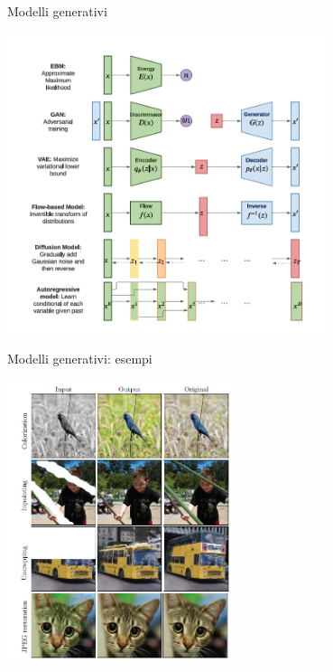 \documentclass[11pt]{beamer}
\begin{document}
\begin{frame}{Modelli generativi \cite{pml1Book,pml2Book}}
\begin{center}
\includegraphics[width=0.7\textwidth]{Pic/generative_models.png}
\end{center}
\end{frame}

\begin{frame}{Modelli generativi: esempi \cite{pml1Book,pml2Book}}
\begin{center}
\includegraphics[width=0.5\textwidth]{Pic/generative_models_example.png}
\end{center}
\end{frame}
\end{document}
